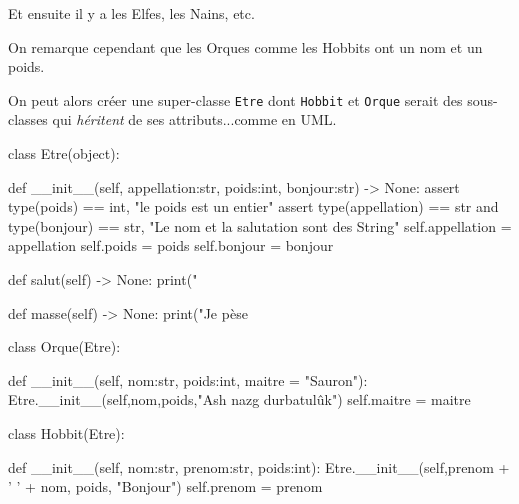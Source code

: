 \documentclass[french]{beamer}
\begin{document}
  \begin{frame}
    
Et ensuite il y a les Elfes, les Nains, etc.

On remarque cependant  que les Orques comme les Hobbits  ont un nom et
un poids. 

On  peut  alors créer  une  \og  super-classe\fg{} \texttt{Etre}  dont
\texttt{Hobbit}   et  \texttt{Orque}   serait  des   sous-classes  qui
\textit{héritent} de ses attributs...comme en UML.
  \end{frame}


  \begin{frame}[fragile]
    \begin{pythoncode}
class Etre(object):

    def __init__(self, appellation:str, poids:int, bonjour:str) -> None:
        assert type(poids) == int, "le poids est un entier"
        assert type(appellation) == str and type(bonjour) == str, "Le nom et la salutation sont des String"
        self.appellation = appellation
        self.poids       = poids
        self.bonjour     = bonjour

    def salut(self) -> None:
        print("%

    def masse(self) -> None:
        print("Je pèse %


class Orque(Etre):

    def __init__(self, nom:str, poids:int, maitre = "Sauron"):
        Etre.__init__(self,nom,poids,"Ash nazg durbatulûk")
        self.maitre = maitre

class Hobbit(Etre):

    def __init__(self, nom:str, prenom:str, poids:int):
        Etre.__init__(self,prenom + ' ' + nom, poids, "Bonjour")
        self.prenom  = prenom
\end{pythoncode}


    
  \end{frame}
\end{document}
